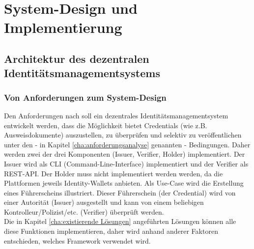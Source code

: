 \chapter{System-Design und Implementierung}
\label{cha:systemdesign}

\section{Architektur des dezentralen Identitätsmanagementsystems}

\subsection{Von Anforderungen zum System-Design}
Den Anforderungen nach soll ein dezentrales Identitätsmanagementsystem entwickelt werden, dass die Möglichkeit bietet Credentials (wie z.B. Ausweisdokumente) auszustellen, zu überprüfen und selektiv zu veröffentlichen unter den - in Kapitel \ref{cha:anforderungsanalyse} genannten - Bedingungen. Daher werden zwei der drei Komponenten (Issuer, Verifier, Holder) implementiert. Der Issuer wird als CLI (Command-Line-Interface) implementiert und der Verifier als REST-API. Der Holder muss nicht implementiert werden werden, da die Plattformen jeweils Identity-Wallets anbieten. Als Use-Case wird die Erstellung eines Führerscheins illustriert. Dieser Führerschein (der Credential) wird von einer Autorität (Issuer) ausgestellt und kann von einem beliebigen Kontrolleur/Polizist/etc. (Verifier) überprüft werden.\\
Die in Kapitel \ref{cha:existierende Lösungen} angeführten Lösungen können alle diese Funktionen implementieren, daher wird anhand anderer Faktoren entschieden, welches Framework verwendet wird.

